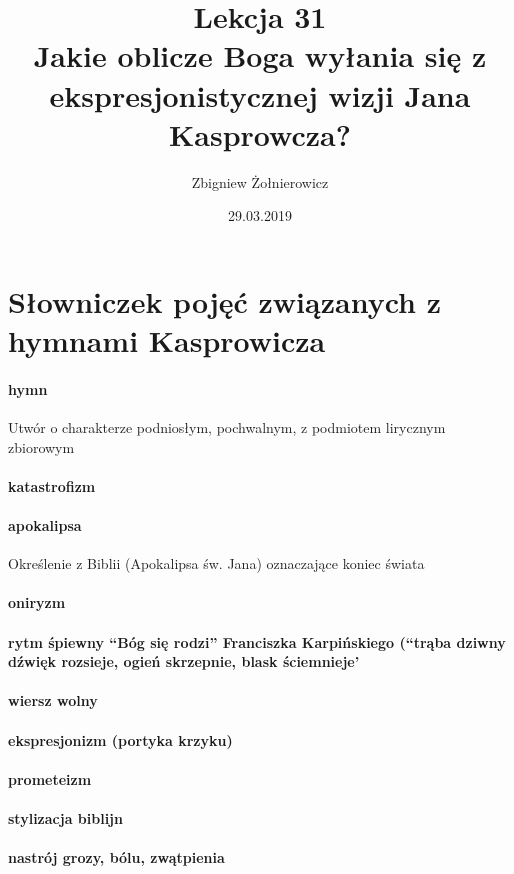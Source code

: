 \documentclass[a4paper]{article}
\begin{document}
\title{
        {\huge Lekcja 31} \\
        {\large Jakie oblicze Boga wyłania się z ekspresjonistycznej wizji Jana Kasprowcza?}
}
\author{Zbigniew Żołnierowicz}
\date{29.03.2019}
\maketitle
\section{Słowniczek pojęć związanych z hymnami Kasprowicza}
    \paragraph*{hymn}
    Utwór o charakterze podniosłym, pochwalnym, z podmiotem lirycznym zbiorowym
    \paragraph*{katastrofizm}
    \paragraph*{apokalipsa}
    Określenie z Biblii (Apokalipsa św. Jana) oznaczające koniec świata
    \paragraph*{oniryzm}
    \paragraph*{rytm śpiewny ``Bóg się rodzi'' Franciszka Karpińskiego  (``trąba dziwny dźwięk rozsieje, ogień skrzepnie, blask ściemnieje'}
    \paragraph*{wiersz wolny}
    \paragraph*{ekspresjonizm (portyka krzyku)}
    \paragraph*{prometeizm}
    \paragraph*{stylizacja biblijn}
    \paragraph*{nastrój grozy, bólu, zwątpienia}
\end{document}
